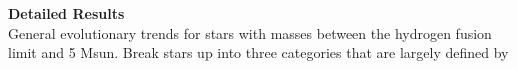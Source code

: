 \textbf{Detailed Results} \\
General evolutionary trends for stars with masses between the hydrogen fusion limit and 5 Msun. Break stars up into three categories that are largely defined by 